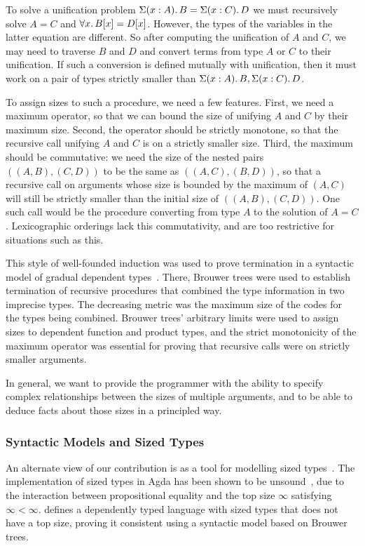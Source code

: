 To solve a unification problem $ \Sigma(x : A)\ldotp B = \Sigma(x : C)\ldotp D$
we must recursively
solve $A = C$ and $\forall x \ldotp B[x] = D[x]$.
However, the types of the variables in the latter equation are different.
So after computing the unification of $A$ and $C$, we may need to traverse
$B$ and $D$ and convert terms from type $A$ or $C$ to their unification.
If such a conversion is defined mutually with unification, then
it must work on a pair of types strictly smaller than
$\Sigma(x : A)\ldotp B , \Sigma(x : C)\ldotp D$.

To assign sizes to such a procedure, we need a few features.
First, we need
a maximum operator, so that we can bound the size of unifying $A$ and $C$
by their maximum size.
Second, the operator should be strictly monotone, so that the recursive
call unifying $A$ and $C$ is on a strictly smaller size.
Third, the maximum should be commutative:
we need the size of the nested pairs $((A,B),(C,D))$
to be the same as $((A,C),(B,D))$, so that a recursive call on arguments whose
size is bounded by the maximum of  $(A,C)$ will still
be strictly smaller than the initial size of $((A,B),(C,D))$.
One such call would be the procedure converting from type $A$ to the
solution of $A=C$.
Lexicographic orderings lack this commutativity, and are too restrictive
for situations such as this.

This style of well-founded induction was used to prove termination
in a syntactic model of gradual dependent types~\citep{Eremondi_2023}. There, Brouwer trees
were used to establish termination of recursive procedures that
combined the type information in two imprecise types.
The decreasing metric was the maximum size of the codes for the types being combined. Brouwer trees' arbitrary limits were used to assign sizes
to dependent function and product types, and the strict monotonicity of the
maximum operator was essential for proving that recursive calls were on
strictly smaller arguments.

In general, we want to provide the programmer with the ability
to specify complex relationships between the sizes of multiple arguments,
and to be able to deduce facts about those sizes in a principled way.

\subsubsection{Syntactic Models and Sized Types}

An alternate view of our contribution is as a tool for modelling sized types~\citep{10.1145/237721.240882}.
The implementation of sized types in Agda has been shown to be unsound~\citep{agdaSizedIssue}, due to the interaction
between propositional equality and the top size $\infty$ satisfying $\infty < \infty$.
 defines a dependently typed language with sized types that does not have a top size, proving it consistent
using a syntactic model based on Brouwer trees.

